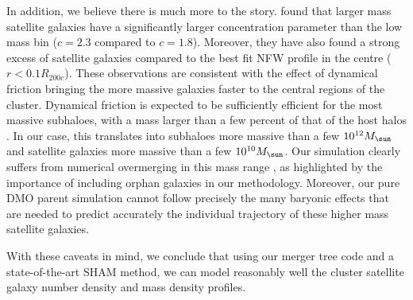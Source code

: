 In   addition,    we   believe   there    is   much   more    to   the
story. \citet{vanderburgEvidenceInsideoutGrowth2015} found that larger
mass  satellite galaxies  have  a  significantly larger  concentration
parameter   than    the   low   mass   bin    ($c=2.3$   compared   to
$c=1.8$). Moreover, they have also  found a strong excess of satellite
galaxies compared to the best fit NFW  profile in the centre ($r < 0.1
R_{200c}$).   These observations  are  consistent with  the effect  of
dynamical friction  bringing the more  massive galaxies faster  to the
central regions of  the cluster. Dynamical friction is  expected to be
sufficiently efficient  for the  most massive  subhaloes, with  a mass
larger than a few  percent of that of the host  halos 
\citep[e.g.][]{binneyGalacticDynamicsSecond2008,Mo}. 
In our case, this  translates into
subhaloes  more  massive  than  a  few  $10^{12}\msol$  and  satellite
galaxies  more  massive than  a  few  $10^{10}\msol$.  Our  simulation
clearly suffers from  numerical overmerging in this  mass range 
\citep{vandenboschDisruptionDarkMatter2018}, as highlighted  by the 
importance of including  orphan galaxies in
our  methodology.  Moreover,  our  pure DMO  parent simulation  cannot
follow precisely the many baryonic  effects that are needed to predict
accurately the  individual trajectory  of these higher  mass satellite
galaxies.

With these  caveats in mind,  we conclude  that using our  merger tree
code and a  state-of-the-art SHAM method, we can  model reasonably well
the cluster satellite galaxy number density and mass density profiles.
